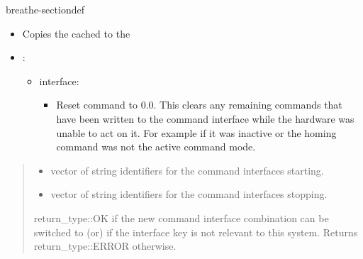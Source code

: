 \documentclass[letterpaper,10pt,english]{sphinxmanual}
\begin{document}
\begin{fulllineitems}
\begin{sphinxuseclass}{breathe-sectiondef}
\begin{fulllineitems}
\begin{itemize}
\item {} 
\sphinxAtStartPar
Copies the cached {\hyperref[\detokenize{code/bioscara_hardware_interfaces/index:classbioscara__hardware__interfaces_1_1BioscaraArmHardwareInterface_1a222af12f49df8ea14f9d0d44a92e9617}]{}} to the {\hyperref[\detokenize{code/bioscara_hardware_interfaces/index:classbioscara__hardware__interfaces_1_1BioscaraArmHardwareInterface_1afc419a32f050cf461e64d958fed917ce}]{}}

\item {} 
\sphinxAtStartPar
{}:\begin{itemize}
\item {} 
\sphinxAtStartPar
{} interface:\begin{itemize}
\item {} 
\sphinxAtStartPar
Reset command to 0.0. This clears any remaining commands that have been written to the command interface while the hardware was unable to act on it. For example if it was inactive or the homing command was not the active command mode.

\end{itemize}


\end{itemize}


\end{itemize}

\begin{quote}\begin{description}
\begin{itemize}
\item {} 
\sphinxAtStartPar
{} \textendash{} vector of string identifiers for the command interfaces starting. 

\item {} 
\sphinxAtStartPar
{} \textendash{} vector of string identifiers for the command interfaces stopping. 

\end{itemize}

\sphinxAtStartPar
return\_type::OK if the new command interface combination can be switched to (or) if the interface key is not relevant to this system. Returns return\_type::ERROR otherwise. 


\end{description}
\end{quote}
\end{fulllineitems}
\end{sphinxuseclass}
\end{fulllineitems}
\end{document}
